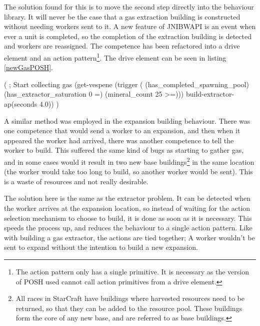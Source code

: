 \documentclass[11pt,openright,a4paper]{report}
\begin{document}
The solution found for this is to move the second step directly into the behaviour library. It will never be the case that a gas extraction building is constructed without needing workers sent to it. A new feature of JNIBWAPI is an event when ever a unit is completed, so the completion of the extraction building is detected and workers are reassigned. The competence has been refactored into a drive element and an action pattern\footnote{The action pattern only has a single primitive. It is necessary as the version of POSH used cannot call action primitives from a drive element.}. The drive element can be seen in listing \ref{newGasPOSH}.

\begin{Code}[frame=single,language=Lisp,tabsize=4,breaklines,breakatwhitespace,caption={The current POSH drive to begin collecting gas},label=newGasPOSH]
(
	; Start collecting gas
	(get-vespene (trigger (	(has_completed_spawning_pool)
							(has_extractor_saturation 0 =)
							(mineral_count 25 >=)))
		build-extractor-ap(seconds 4.0))
)
\end{Code}

A similar method was employed in the expansion building behaviour. There was one competence that would send a worker to an expansion, and then when it appeared the worker had arrived, there was another competence to tell the worker to build. This suffered the same kind of bugs as starting to gather gas, and in some cases would it result in two new base buildings\footnote{All races in StarCraft have buildings where harvested resources need to be returned, so that they can be added to the resource pool. These buildings form the core of any new base, and are referred to as base buildings.} in the same location (the worker would take too long to build, so another worker would be sent). This is a waste of resources and not really desirable.

The solution here is the same as the extractor problem. It can be detected when the worker arrives at the expansion location, so instead of waiting for the action selection mechanism to choose to build, it is done as soon as it is necessary. This speeds the process up, and reduces the behaviour to a single action pattern. Like with building a gas extractor, the actions are tied together; A worker wouldn't be sent to expand without the intention to build a new expansion.
\end{document}
